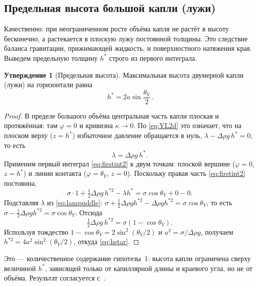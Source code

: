 \documentclass[11pt]{article}
\newcommand{\thY}{\theta_{Y}}
\theoremstyle{definition}
\newtheorem{statement}{Утверждение}
\begin{document}
\subsection{Предельная высота большой капли (лужи)}
\label{sec:hstar}
Качественно: при неограниченном росте объёма капля не растёт в высоту бесконечно,
а растекается в плоскую лужу постоянной толщины. Это следствие баланса гравитации,
прижимающей жидкость, и поверхностного натяжения края. Выведем предельную толщину
$h^{*}$ строго из первого интеграла.

\begin{statement}[Предельная высота]
Максимальная высота двумерной капли (лужи) на горизонтали равна
\begin{equation}
\boxed{\ h^{*}=2a\sin\!\frac{\thY}{2}\ }.
\label{eq:hstar}
\end{equation}
\end{statement}
\begin{proof}
В пределе большого объёма центральная часть капли плоская и протяжённая: там
$\varphi=0$ и кривизна $\kappa\to 0$. По \eqref{eq:YL2d} это означает, что на
плоском верху ($z=h^{*}$) избыточное давление обращается в нуль,
$\lambda-\Delta\rho g\,h^{*}=0$, то есть
\begin{equation}
\lambda=\Delta\rho g\,h^{*}.
\label{eq:lampuddle}
\end{equation}
Применим первый интеграл \eqref{eq:firstint2} к двум точкам: плоской вершине
($\varphi=0$, $z=h^{*}$) и линии контакта ($\varphi=\thY$, $z=0$). Поскольку
правая часть \eqref{eq:firstint2} постоянна,
\[
\sigma\cdot 1+\tfrac12\Delta\rho g\,h^{*2}-\lambda h^{*}
=\sigma\cos\thY+0-0 .
\]
Подставляя $\lambda$ из \eqref{eq:lampuddle}:
$\sigma+\tfrac12\Delta\rho g h^{*2}-\Delta\rho g h^{*2}=\sigma\cos\thY$, то есть
$\sigma-\tfrac12\Delta\rho g h^{*2}=\sigma\cos\thY$. Отсюда
\[
\tfrac12\Delta\rho g\,h^{*2}=\sigma(1-\cos\thY).
\]
Используя тождество $1-\cos\thY=2\sin^{2}(\thY/2)$ и $a^{2}=\sigma/\Delta\rho g$,
получаем $h^{*2}=4a^{2}\sin^{2}(\thY/2)$, откуда \eqref{eq:hstar}.
\end{proof}

Это --- количественное содержание гипотезы~1: высота капли ограничена сверху
величиной $h^{*}$, зависящей только от капиллярной длины и краевого угла, но не от
объёма. Результат согласуется с~\cite{Matyukhin2013,Lv2017,deGennes2004}.
\end{document}
